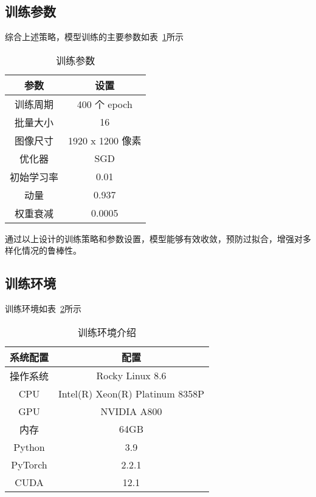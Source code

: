 \subsection{训练参数}
综合上述策略，模型训练的主要参数如表~\ref{tab:train_param}所示
\begin{table}[htbp]
	\centering
	\caption{训练参数}
	\label{tab:train_param}
	{%
		\renewcommand{\arraystretch}{1.2}%
		\begin{tabular}{cc}  %
			\toprule[1.5pt]
			参数        & 设置 \\
			\midrule[1pt]
			训练周期    & 400 个 epoch \\
			批量大小    & 16 \\
			图像尺寸    & 1920 x 1200 像素 \\
			优化器      & SGD \\
			初始学习率  & 0.01 \\
			动量        & 0.937 \\
			权重衰减    & 0.0005 \\
			\bottomrule[1.5pt]
		\end{tabular}
	}
\end{table}

通过以上设计的训练策略和参数设置，模型能够有效收敛，预防过拟合，增强对多样化情况的鲁棒性。
\subsection{训练环境}
训练环境如表~\ref{tab:training_env}所示
\begin{table}[htbp]
	\centering
	\caption{训练环境介绍}
	\label{tab:training_env}
	{%
		\renewcommand{\arraystretch}{1.2}%
		\begin{tabular}{cc}  %
			\toprule[1.5pt]
			系统配置   & 配置 \\
			\midrule[1pt]
			操作系统   & Rocky Linux 8.6 \\
			CPU        & Intel(R) Xeon(R) Platinum 8358P \\
			GPU        & NVIDIA A800 \\
			内存       & 64GB \\
			Python     & 3.9 \\
			PyTorch    & 2.2.1 \\
			CUDA       & 12.1 \\
			\bottomrule[1.5pt]
		\end{tabular}
	}
\end{table}
